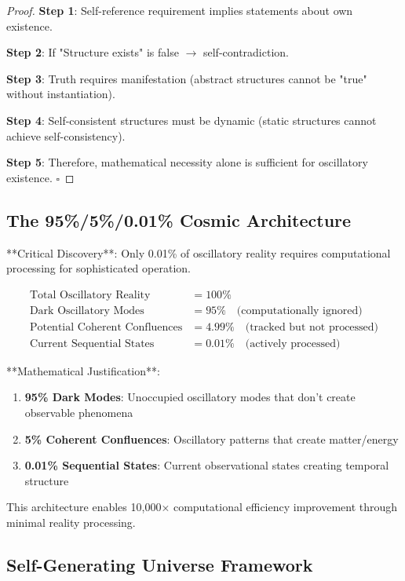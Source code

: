 \documentclass[12pt,a4paper]{article}
\theoremstyle{remark}
\begin{document}
\begin{proof}
\textbf{Step 1}: Self-reference requirement implies statements about own existence.

\textbf{Step 2}: If "Structure exists" is false $\rightarrow$ self-contradiction.

\textbf{Step 3}: Truth requires manifestation (abstract structures cannot be "true" without instantiation).

\textbf{Step 4}: Self-consistent structures must be dynamic (static structures cannot achieve self-consistency).

\textbf{Step 5}: Therefore, mathematical necessity alone is sufficient for oscillatory existence. $\square$
\end{proof}

\subsection{The 95\%/5\%/0.01\% Cosmic Architecture}

**Critical Discovery**: Only 0.01\% of oscillatory reality requires computational processing for sophisticated operation.

\begin{align}
\text{Total Oscillatory Reality} &= 100\% \\
\text{Dark Oscillatory Modes} &= 95\% \quad \text{(computationally ignored)} \\
\text{Potential Coherent Confluences} &= 4.99\% \quad \text{(tracked but not processed)} \\
\text{Current Sequential States} &= 0.01\% \quad \text{(actively processed)}
\end{align}

**Mathematical Justification**:
\begin{enumerate}
\item \textbf{95\% Dark Modes}: Unoccupied oscillatory modes that don't create observable phenomena
\item \textbf{5\% Coherent Confluences}: Oscillatory patterns that create matter/energy
\item \textbf{0.01\% Sequential States}: Current observational states creating temporal structure
\end{enumerate}

This architecture enables 10,000× computational efficiency improvement through minimal reality processing.

\subsection{Self-Generating Universe Framework}
\end{document}
